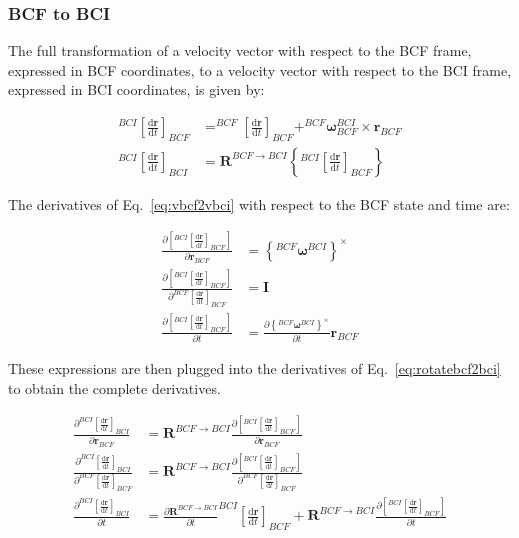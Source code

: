 \documentclass[]{article}
\newcommand{\vb}[1]{\bm{#1}} %
\newcommand{\ddt}[1]{\frac{\mathrm{d} #1}{\mathrm{d} t}} %
\newcommand{\pd}[2]{\frac{\partial #1}{\partial #2}} %
\begin{document}
\subsubsection{BCF to BCI}

The full transformation of a velocity vector with respect to the BCF frame, expressed in BCF coordinates, to a velocity vector with respect to the BCI frame, expressed in BCI coordinates, is given by:

\begin{align}
\label{eq:vbcf2vbci}
^{BCI} \left[ \ddt{\vb{r}} \right]_{BCF} &= ^{BCF} \left[ \ddt{\vb{r}} \right]_{BCF} + ^{BCF} \vb{\omega}_{BCF}^{BCI} \times \vb{r}_{BCF} \\
\label{eq:rotatebcf2bci}
^{BCI} \left[ \ddt{\vb{r}} \right]_{BCI} &= \vb{R}^{BCF \rightarrow BCI} \left\{^{BCI} \left[ \ddt{\vb{r}} \right]_{BCF} \right\}
\end{align}

The derivatives of Eq.~\eqref{eq:vbcf2vbci} with respect to the BCF state and time are:

\begin{align}
\pd{\left[ ^{BCI} \left[ \ddt{\vb{r}} \right]_{BCF} \right]}{\vb{r}_{BCF}} &= \left\{ ^{BCF} \vb{\omega}^{BCI} \right\}^{\times} \\
\pd{\left[ ^{BCI} \left[ \ddt{\vb{r}} \right]_{BCF} \right]}{^{BCF} \left[ \ddt{\vb{r}} \right]_{BCF}} &= \vb{I} \\
\pd{\left[ ^{BCI} \left[ \ddt{\vb{r}} \right]_{BCF} \right]}{t} &= { \pd{\left\{ ^{BCF} \vb{\omega}^{BCI} \right\}^{\times}}{t}} \vb{r}_{BCF}
\end{align}

These expressions are then plugged into the derivatives of Eq.~\eqref{eq:rotatebcf2bci} to obtain the complete derivatives.

\begin{align}
\pd{^{BCI} \left[ \ddt{\vb{r}} \right]_{BCI}}{\vb{r}_{BCF}} &= \vb{R}^{BCF \rightarrow BCI} \pd{\left[ ^{BCI} \left[ \ddt{\vb{r}} \right]_{BCF} \right]}{\vb{r}_{BCF}} \\
\pd{^{BCI} \left[ \ddt{\vb{r}} \right]_{BCI}}{^{BCF} \left[ \ddt{\vb{r}} \right]_{BCF}} &= \vb{R}^{BCF \rightarrow BCI} \pd{\left[ ^{BCI} \left[ \ddt{\vb{r}} \right]_{BCF} \right]}{^{BCF} \left[ \ddt{\vb{r}} \right]_{BCF}} \\
\pd{^{BCI} \left[ \ddt{\vb{r}} \right]_{BCI}}{t} &= \pd{\vb{R}^{BCF \rightarrow BCI}}{t} ^{BCI} \left[ \ddt{\vb{r}} \right]_{BCF} + \vb{R}^{BCF \rightarrow BCI} \pd{\left[ ^{BCI} \left[ \ddt{\vb{r}} \right]_{BCF} \right]}{t}
\end{align}
\end{document}
